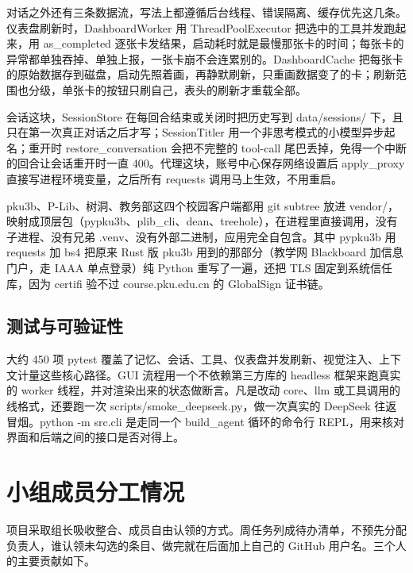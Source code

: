 \documentclass[UTF8,a4paper,11pt,fontset=none]{ctexart}
\newcommand{\code}[1]{{\ttfamily\small #1}}
\begin{document}
对话之外还有三条数据流，写法上都遵循后台线程、错误隔离、缓存优先这几条。仪表盘刷新时，\code{DashboardWorker} 用 \code{ThreadPoolExecutor} 把选中的工具并发跑起来，用 \code{as\_completed} 逐张卡发结果，启动耗时就是最慢那张卡的时间；每张卡的异常都单独吞掉、单独上报，一张卡崩不会连累别的。\code{DashboardCache} 把每张卡的原始数据存到磁盘，启动先照着画，再静默刷新，只重画数据变了的卡；刷新范围也分级，单张卡的按钮只刷自己，表头的刷新才重载全部。

会话这块，\code{SessionStore} 在每回合结束或关闭时把历史写到 \code{data/sessions/} 下，且只在第一次真正对话之后才写；\code{SessionTitler} 用一个非思考模式的小模型异步起名；重开时 \code{restore\_conversation} 会把不完整的 tool-call 尾巴丢掉，免得一个中断的回合让会话重开时一直 400。代理这块，账号中心保存网络设置后 \code{apply\_proxy} 直接写进程环境变量，之后所有 \code{requests} 调用马上生效，不用重启。

pku3b、P-Lib、树洞、教务部这四个校园客户端都用 git subtree 放进 \code{vendor/}，映射成顶层包（\code{pypku3b}、\code{plib\_cli}、\code{dean}、\code{treehole}），在进程里直接调用，没有子进程、没有兄弟 \code{.venv}、没有外部二进制，应用完全自包含。其中 \code{pypku3b} 用 \code{requests} 加 \code{bs4} 把原来 Rust 版 pku3b 用到的那部分（教学网 Blackboard 加信息门户，走 IAAA 单点登录）纯 Python 重写了一遍，还把 TLS 固定到系统信任库，因为 certifi 验不过 \code{course.pku.edu.cn} 的 GlobalSign 证书链。

\subsection{测试与可验证性}

大约 450 项 pytest 覆盖了记忆、会话、工具、仪表盘并发刷新、视觉注入、上下文计量这些核心路径。GUI 流程用一个不依赖第三方库的 headless 框架来跑真实的 worker 线程，并对渲染出来的状态做断言。凡是改动 \code{core}、\code{llm} 或工具调用的线格式，还要跑一次 \code{scripts/smoke\_deepseek.py}，做一次真实的 DeepSeek 往返冒烟。\code{python -m src.cli} 是走同一个 \code{build\_agent} 循环的命令行 REPL，用来核对界面和后端之间的接口是否对得上。

\section{小组成员分工情况}

项目采取组长吸收整合、成员自由认领的方式。周任务列成待办清单，不预先分配负责人，谁认领未勾选的条目、做完就在后面加上自己的 GitHub 用户名。三个人的主要贡献如下。
\end{document}
